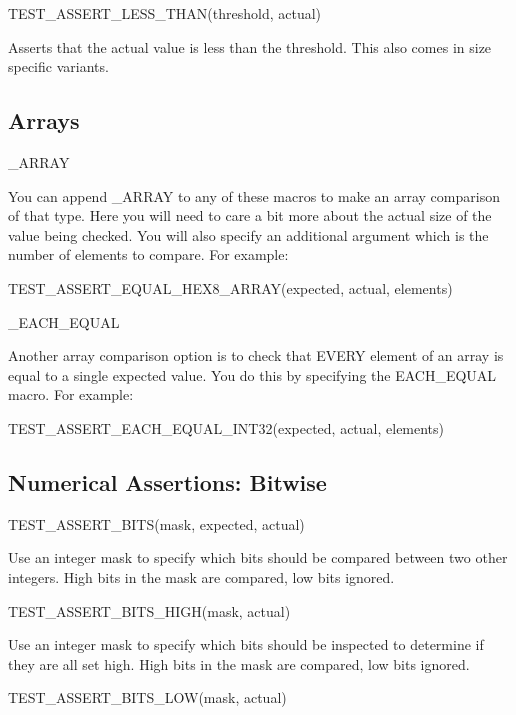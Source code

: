 \begin{DoxyVerb}TEST_ASSERT_LESS_THAN(threshold, actual)
\end{DoxyVerb}


Asserts that the actual value is less than the threshold. This also comes in size specific variants.

\subsection*{Arrays }

\begin{DoxyVerb}_ARRAY
\end{DoxyVerb}


You can append {\ttfamily \+\_\+\+A\+R\+R\+AY} to any of these macros to make an array comparison of that type. Here you will need to care a bit more about the actual size of the value being checked. You will also specify an additional argument which is the number of elements to compare. For example\+: \begin{DoxyVerb}TEST_ASSERT_EQUAL_HEX8_ARRAY(expected, actual, elements)

_EACH_EQUAL
\end{DoxyVerb}


Another array comparison option is to check that E\+V\+E\+RY element of an array is equal to a single expected value. You do this by specifying the E\+A\+C\+H\+\_\+\+E\+Q\+U\+AL macro. For example\+: \begin{DoxyVerb}TEST_ASSERT_EACH_EQUAL_INT32(expected, actual, elements)
\end{DoxyVerb}


\subsection*{Numerical Assertions\+: Bitwise }

\begin{DoxyVerb}TEST_ASSERT_BITS(mask, expected, actual)
\end{DoxyVerb}


Use an integer mask to specify which bits should be compared between two other integers. High bits in the mask are compared, low bits ignored. \begin{DoxyVerb}TEST_ASSERT_BITS_HIGH(mask, actual)
\end{DoxyVerb}


Use an integer mask to specify which bits should be inspected to determine if they are all set high. High bits in the mask are compared, low bits ignored. \begin{DoxyVerb}TEST_ASSERT_BITS_LOW(mask, actual)
\end{DoxyVerb}


